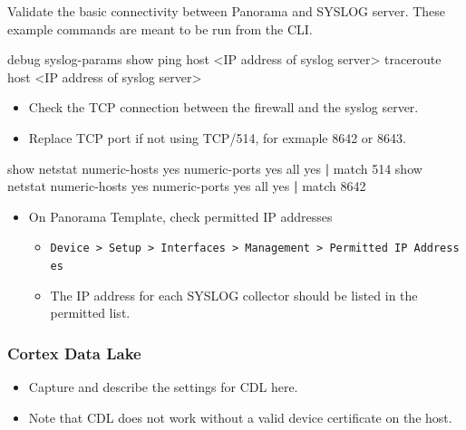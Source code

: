 \documentclass[
  english,
  twoside]{article}
\newenvironment{Shaded}{}{}
\newcommand{\ExtensionTok}[1]{#1}
\newcommand{\FunctionTok}[1]{\textcolor[rgb]{0.02,0.16,0.49}{#1}}
\newcommand{\KeywordTok}[1]{\textcolor[rgb]{0.00,0.44,0.13}{\textbf{#1}}}
\newcommand{\NormalTok}[1]{#1}
\newcommand{\OperatorTok}[1]{\textcolor[rgb]{0.40,0.40,0.40}{#1}}
\providecommand{\tightlist}{%
  \setlength{\itemsep}{0pt}\setlength{\parskip}{0pt}}
\begin{document}
Validate the basic connectivity between Panorama and SYSLOG server.
These example commands are meant to be run from the CLI.

\begin{Shaded}
\begin{Highlighting}[]
\ExtensionTok{debug}\NormalTok{ syslog{-}params show}
\FunctionTok{ping}\NormalTok{ host }\OperatorTok{\textless{}}\NormalTok{IP address of syslog server}\OperatorTok{\textgreater{}}
\ExtensionTok{traceroute}\NormalTok{ host }\OperatorTok{\textless{}}\NormalTok{IP address of syslog server}\OperatorTok{\textgreater{}}
\end{Highlighting}
\end{Shaded}

\begin{itemize}
\tightlist
\item
  Check the TCP connection between the firewall and the syslog server.
\item
  Replace TCP port if not using TCP/514, for exmaple 8642 or 8643.
\end{itemize}

\begin{Shaded}
\begin{Highlighting}[]
\ExtensionTok{show}\NormalTok{ netstat numeric{-}hosts yes numeric{-}ports yes all yes }\KeywordTok{|} \ExtensionTok{match}\NormalTok{ 514}
\ExtensionTok{show}\NormalTok{ netstat numeric{-}hosts yes numeric{-}ports yes all yes }\KeywordTok{|} \ExtensionTok{match}\NormalTok{ 8642}
\end{Highlighting}
\end{Shaded}

\begin{itemize}
\tightlist
\item
  On Panorama Template, check permitted IP addresses

  \begin{itemize}
  \tightlist
  \item
    \texttt{Device\ \textgreater{}\ Setup\ \textgreater{}\ Interfaces\ \textgreater{}\ Management\ \textgreater{}\ Permitted\ IP\ Addresses}
  \item
    The IP address for each SYSLOG collector should be listed in the
    permitted list.
  \end{itemize}
\end{itemize}

\hypertarget{cortex-data-lake}{%
\subsubsection{Cortex Data Lake}\label{cortex-data-lake}}

\begin{itemize}
\tightlist
\item
  Capture and describe the settings for CDL here.
\item
  Note that CDL does not work without a valid device certificate on the
  host.
\end{itemize}
\end{document}
